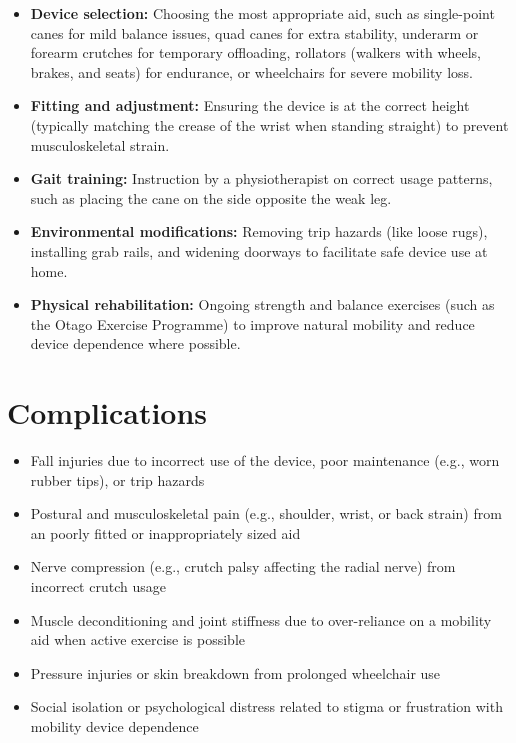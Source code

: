 \begin{itemize}
    \item \textbf{Device selection:} Choosing the most appropriate aid, such as single-point canes for mild balance issues, quad canes for extra stability, underarm or forearm crutches for temporary offloading, rollators (walkers with wheels, brakes, and seats) for endurance, or wheelchairs for severe mobility loss.
    \item \textbf{Fitting and adjustment:} Ensuring the device is at the correct height (typically matching the crease of the wrist when standing straight) to prevent musculoskeletal strain.
    \item \textbf{Gait training:} Instruction by a physiotherapist on correct usage patterns, such as placing the cane on the side opposite the weak leg.
    \item \textbf{Environmental modifications:} Removing trip hazards (like loose rugs), installing grab rails, and widening doorways to facilitate safe device use at home.
    \item \textbf{Physical rehabilitation:} Ongoing strength and balance exercises (such as the Otago Exercise Programme) to improve natural mobility and reduce device dependence where possible.
\end{itemize}

\section*{Complications}
\begin{itemize}
    \item Fall injuries due to incorrect use of the device, poor maintenance (e.g., worn rubber tips), or trip hazards
    \item Postural and musculoskeletal pain (e.g., shoulder, wrist, or back strain) from an poorly fitted or inappropriately sized aid
    \item Nerve compression (e.g., crutch palsy affecting the radial nerve) from incorrect crutch usage
    \item Muscle deconditioning and joint stiffness due to over-reliance on a mobility aid when active exercise is possible
    \item Pressure injuries or skin breakdown from prolonged wheelchair use
    \item Social isolation or psychological distress related to stigma or frustration with mobility device dependence
\end{itemize}


